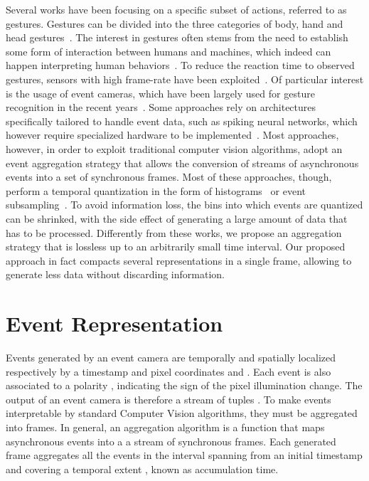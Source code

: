 \documentclass[a4paper,conference]{IEEEtran}
\begin{document}
Several works have been focusing on a specific subset of actions, referred to as gestures. Gestures can be divided into the three categories of body, hand and head gestures~\cite{mitra2007gesture}. The interest in gestures often stems from the need to establish some form of interaction between humans and machines, which indeed can happen interpreting human behaviors~\cite{liu2018gesture}. To reduce the reaction time to observed gestures, sensors with high frame-rate have been exploited~\cite{sato2006ohajiki}. Of particular interest is the usage of event cameras, which have been largely used for gesture recognition in the recent years~\cite{maro2020event, kaiser2019embodied, shrestha2018slayer, amir2017low, wang2019space, kaiser2020synaptic, ghosh2019spatiotemporal, bi2019graph}.
Some approaches rely on architectures specifically tailored to handle event data, such as spiking neural networks, which however require specialized hardware to be implemented~\cite{o2013real, kaiser2020synaptic, shrestha2018slayer}.
Most approaches, however, in order to exploit traditional computer vision algorithms, adopt an event aggregation strategy that allows the conversion of streams of asynchronous events into a set of synchronous frames. Most of these approaches, though, perform a temporal quantization in the form of histograms~\cite{ghosh2019spatiotemporal} or event subsampling~\cite{kaiser2019embodied}. To avoid information loss, the bins into which events are quantized can be shrinked, with the side effect of generating a large amount of data that has to be processed. Differently from these works, we propose an aggregation strategy that is lossless up to an arbitrarily small time interval. Our proposed approach in fact compacts several representations in a single frame, allowing to generate less data without discarding information.



\section{Event Representation}
\label{sec:method}
Events generated by an event camera are temporally and spatially localized respectively by a timestamp  and pixel coordinates  and . Each event is also associated to a polarity , indicating the sign of the pixel illumination change. The output of an event camera is therefore a stream of tuples .
To make events interpretable by standard Computer Vision algorithms, they must be aggregated into frames. In general, an aggregation algorithm is a function that maps asynchronous events into a a stream of synchronous frames.
Each generated frame  aggregates all the events in the interval  spanning from an initial timestamp  and covering a temporal extent , known as accumulation time.
\end{document}
